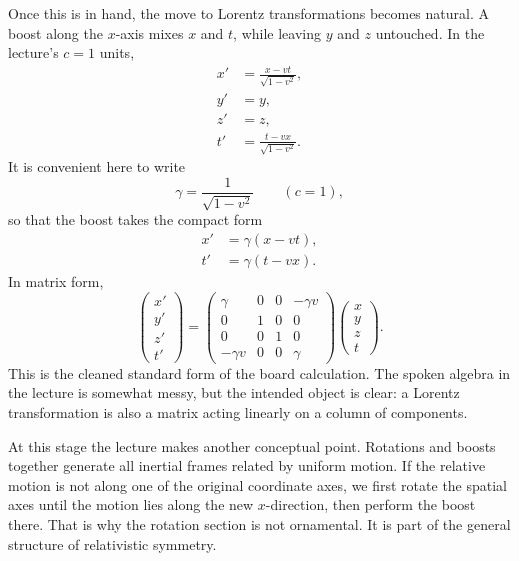Once this is in hand, the move to Lorentz transformations becomes natural. A boost along the \(x\)-axis mixes \(x\) and \(t\), while leaving \(y\) and \(z\) untouched. In the lecture's \(c=1\) units,
\begin{align}
x' &= \frac{x-vt}{\sqrt{1-v^2}}, \\
y' &= y, \\
z' &= z, \\
t' &= \frac{t-vx}{\sqrt{1-v^2}}.
\end{align}
It is convenient here to write
\begin{equation}
\gamma = \frac{1}{\sqrt{1-v^2}}
\qquad (c=1),
\end{equation}
so that the boost takes the compact form
\begin{align}
x' &= \gamma(x-vt), \\
t' &= \gamma(t-vx).
\end{align}
In matrix form,
\begin{equation}
\begin{pmatrix}
x'\\
y'\\
z'\\
t'
\end{pmatrix}
=
\begin{pmatrix}
\gamma & 0 & 0 & -\gamma v \\
0 & 1 & 0 & 0 \\
0 & 0 & 1 & 0 \\
-\gamma v & 0 & 0 & \gamma
\end{pmatrix}
\begin{pmatrix}
x\\
y\\
z\\
t
\end{pmatrix}.
\end{equation}
This is the cleaned standard form of the board calculation. The spoken algebra in the lecture is somewhat messy, but the intended object is clear: a Lorentz transformation is also a matrix acting linearly on a column of components.

At this stage the lecture makes another conceptual point. Rotations and boosts together generate all inertial frames related by uniform motion. If the relative motion is not along one of the original coordinate axes, we first rotate the spatial axes until the motion lies along the new \(x\)-direction, then perform the boost there. That is why the rotation section is not ornamental. It is part of the general structure of relativistic symmetry.

